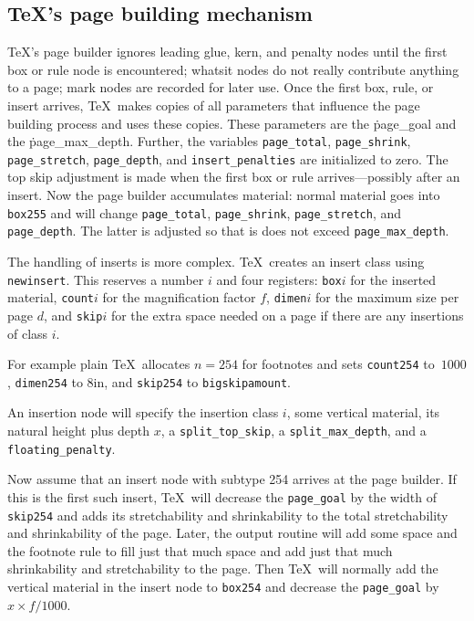 \subsection{\TeX's page building mechanism}
\TeX's page builder ignores leading glue, kern,
and penalty nodes until the first
box or rule node is encountered;
whatsit nodes do not really contribute anything to
a page; mark nodes are recorded for later use.  Once
the first box, rule, or insert arrives, \TeX\ makes
copies of all parameters that influence the page building process and
uses these copies. These parameters are the \.{page\_goal} and the
\.{page\_max\_depth}. Further, the variables {\tt page\_total}, {\tt page\_shrink},
{\tt page\_stretch}, {\tt page\_depth}, and {\tt in\-sert\_pe\-nal\-ties} are
initialized to zero.  The top skip adjustment is made
when the first box or rule arrives---possibly after an insert.
Now the page builder accumulates material: normal material goes
into {\tt box255} and will change {\tt page\_total}, {\tt page\_shrink}, 
{\tt page\_stretch}, and {\tt page\_depth}. The latter is adjusted so that 
is does not exceed {\tt page\_max\_depth}.

The handling of inserts is more complex.
\TeX\ creates an insert class using {\tt newinsert}. This reserves a number $i$
and four registers: {\tt box\hair$i$} for the inserted material,
{\tt count\hair$i$} for the magnification factor $f$, {\tt dimen\hair$i$}
for the maximum size per page $d$, and {\tt skip\hair$i$} for the
extra space needed on a page if there are any insertions of class $i$.

For example plain \TeX\ allocates $n=254$ for footnotes and sets
{\tt count254} to~$1000$, {\tt dimen254} to 8in, and {\tt skip254} to {\tt \BS big\-skip\-amount}.

An insertion node will specify the insertion class $i$, some vertical material,
its natural height plus depth $x$, a {\tt split\-\_top\-\_skip}, a {\tt split\-\_max\_depth},
and a {\tt floa\-ting\-\_pe\-nal\-ty}. 


Now assume that an insert node with subtype 254 arrives at the page builder.
If this is the first such insert, \TeX\ will decrease the {\tt page\_goal}
by the width of {\tt skip254} and adds its stretchability and shrinkability
to the total stretchability and shrinkability of the page. Later,
the output routine will add some space and the footnote rule to fill just that
much space and add just that much shrinkability and stretchability to the page.
Then \TeX\ will normally add the vertical material in the insert node to
{\tt box254} and decrease the {\tt page\_goal} by $x\times f/1000$.

